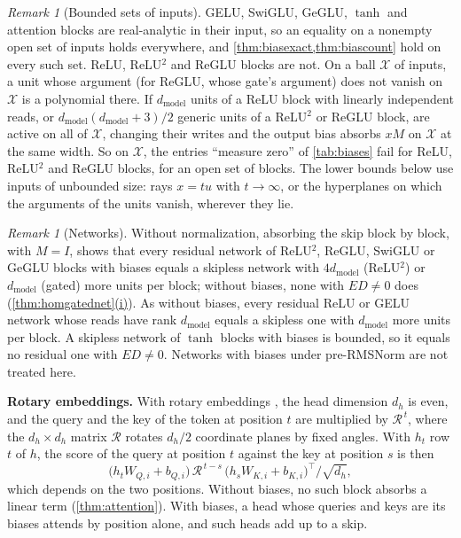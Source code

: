\documentclass[10pt]{article}
\theoremstyle{definition}
\theoremstyle{remark}
\newtheorem{remark}[theorem]{Remark}
\newcommand{\dm}{d_{\mathrm{model}}}
\newcommand{\para}[1]{\smallskip\noindent\textbf{#1}\hspace{0.5em}}
\DeclareRobustCommand{\cpref}[2]{\hyperref[#1:#2]{\cref*{#1}(#2)}}
\begin{document}
\begin{remark}[Bounded sets of inputs]\label{rem:biasbounded}
GELU, SwiGLU, GeGLU, $\tanh$ and attention blocks are real-analytic in their input, so an equality on a nonempty open set of inputs holds everywhere, and \cref{thm:biasexact,thm:biascount} hold on every such set. ReLU, ReLU$^2$ and ReGLU blocks are not. On a ball $\mathcal X$ of inputs, a unit whose argument (for ReGLU, whose gate's argument) does not vanish on $\mathcal X$ is a polynomial there. If $\dm$ units of a ReLU block with linearly independent reads, or $\dm(\dm+3)/2$ generic units of a ReLU$^2$ or ReGLU block, are active on all of $\mathcal X$, changing their writes and the output bias absorbs $xM$ on $\mathcal X$ at the same width. So on $\mathcal X$, the entries ``measure zero'' of \cref{tab:biases} fail for ReLU, ReLU$^2$ and ReGLU blocks, for an open set of blocks. The lower bounds below use inputs of unbounded size: rays $x = tu$ with $t \to \infty$, or the hyperplanes on which the arguments of the units vanish, wherever they lie.
\end{remark}

\begin{remark}[Networks]\label{rem:biasnetworks}
Without normalization, absorbing the skip block by block, with $M = I$, shows that every residual network of ReLU$^2$, ReGLU, SwiGLU or GeGLU blocks with biases equals a skipless network with $4\dm$ (ReLU$^2$) or $\dm$ (gated) more units per block; without biases, none with $ED \neq 0$ does (\cpref{thm:homgatednet}{i}). As without biases, every residual ReLU or GELU network whose reads have rank $\dm$ equals a skipless one with $\dm$ more units per block. A skipless network of $\tanh$ blocks with biases is bounded, so it equals no residual one with $ED \neq 0$. Networks with biases under pre-RMSNorm are not treated here.
\end{remark}

\para{Rotary embeddings.} With rotary embeddings \citep{su2021roformer}, the head dimension $d_h$ is even, and the query and the key of the token at position $t$ are multiplied by $\mathcal R^{\,t}$, where the $d_h\times d_h$ matrix $\mathcal R$ rotates $d_h/2$ coordinate planes by fixed angles. With $h_t$ row $t$ of $h$, the score of the query at position $t$ against the key at position $s$ is then
\[
\big(h_tW_{Q,i} + b_{Q,i}\big)\,\mathcal R^{\,t-s}\,\big(h_sW_{K,i} + b_{K,i}\big)^\top/\sqrt{d_h},
\]
which depends on the two positions. Without biases, no such block absorbs a linear term (\cref{thm:attention}). With biases, a head whose queries and keys are its biases attends by position alone, and such heads add up to a skip.
\end{document}
